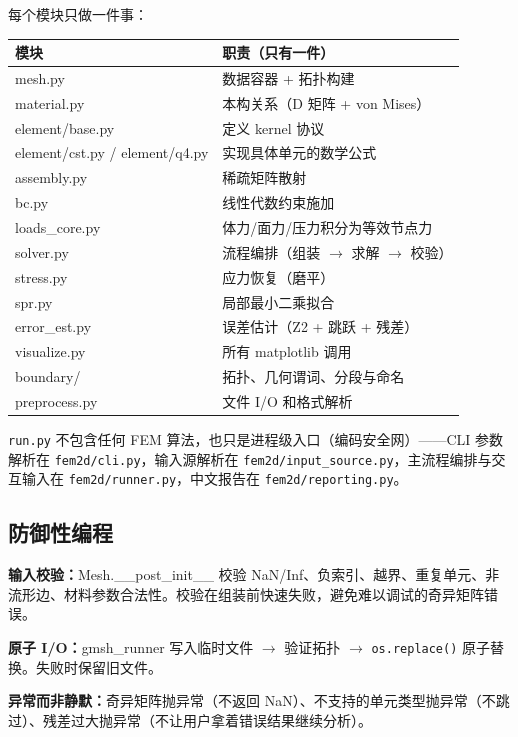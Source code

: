 \documentclass[12pt,a4paper]{ctexart}
\begin{document}
每个模块只做一件事：

\begin{center}
\begin{tabular}{ll}
\hline
\textbf{模块} & \textbf{职责（只有一件）} \\
\hline
mesh.py & 数据容器 + 拓扑构建 \\
material.py & 本构关系（D 矩阵 + von Mises） \\
element/base.py & 定义 kernel 协议 \\
element/cst.py / element/q4.py & 实现具体单元的数学公式 \\
assembly.py & 稀疏矩阵散射 \\
bc.py & 线性代数约束施加 \\
loads\_core.py & 体力/面力/压力积分为等效节点力 \\
solver.py & 流程编排（组装 $\rightarrow$ 求解 $\rightarrow$ 校验） \\
stress.py & 应力恢复（磨平） \\
spr.py & 局部最小二乘拟合 \\
error\_est.py & 误差估计（Z2 + 跳跃 + 残差） \\
visualize.py & 所有 matplotlib 调用 \\
boundary/ & 拓扑、几何谓词、分段与命名 \\
preprocess.py & 文件 I/O 和格式解析 \\
\hline
\end{tabular}
\end{center}

\texttt{run.py} 不包含任何 FEM 算法，也只是进程级入口（编码安全网）——CLI 参数解析在 \texttt{fem2d/cli.py}，输入源解析在 \texttt{fem2d/input\_source.py}，主流程编排与交互输入在 \texttt{fem2d/runner.py}，中文报告在 \texttt{fem2d/reporting.py}。

\subsection{防御性编程}

\textbf{输入校验：}Mesh.\_\_post\_init\_\_ 校验 NaN/Inf、负索引、越界、重复单元、非流形边、材料参数合法性。校验在组装前快速失败，避免难以调试的奇异矩阵错误。

\textbf{原子 I/O：}gmsh\_runner 写入临时文件 $\rightarrow$ 验证拓扑 $\rightarrow$ \texttt{os.replace()} 原子替换。失败时保留旧文件。

\textbf{异常而非静默：}奇异矩阵抛异常（不返回 NaN）、不支持的单元类型抛异常（不跳过）、残差过大抛异常（不让用户拿着错误结果继续分析）。
\end{document}
